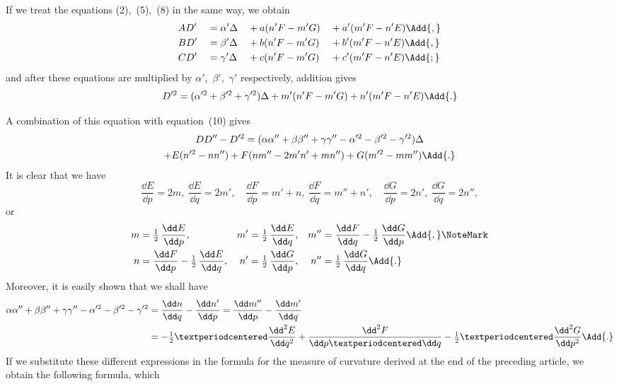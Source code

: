 If we treat the equations (2),~(5),~(8) in the same way, we obtain
\begin{alignat*}{4}
&AD' &&= \alpha'\Delta &&+ a (n'F - m'G) &&+ a'(m'F - n'E)\Add{,} \\
&BD' &&= \beta' \Delta &&+ b (n'F - m'G) &&+ b'(m'F - n'E)\Add{,} \\
&CD' &&= \gamma'\Delta &&+ c (n'F - m'G) &&+ c'(m'F - n'E)\Add{;}
\end{alignat*}
and after these equations are multiplied by $\alpha'$,~$\beta'$,~$\gamma'$ respectively, addition gives
\[
D'^{2} = (\alpha'^{2} + \beta'^{2} + \gamma'^{2})\Delta
  + m'(n'F - m'G) + n'(m'F - n'E)\Add{.}
\]

A combination of this equation with equation~(10) gives
\begin{multline*}
DD'' - D'^{2} = (\alpha\alpha'' + \beta\beta'' + \gamma\gamma''
  - \alpha'^{2} - \beta'^{2} - \gamma'^{2})\Delta \\
  + E(n'^{2} - nn'') + F(nm'' - 2m'n' + mn'') + G(m'^{2} - mm'')\Add{.}
\end{multline*}
It is clear that we have
\[
\frac{\dd E}{\dd p} = 2m,\
\frac{\dd E}{\dd q} = 2m',\quad
\frac{\dd F}{\dd p} = m' + n,\
\frac{\dd F}{\dd q} = m'' + n',\quad
\frac{\dd G}{\dd p} = 2n',\
\frac{\dd G}{\dd q} = 2n'',
\]
or
\begin{align*}
m   &= \tfrac{1}{2}\, \frac{\dd E}{\dd p}, &
m'  &= \tfrac{1}{2}\, \frac{\dd E}{\dd q}, &
m'' &= \frac{\dd F}{\dd q} - \tfrac{1}{2}\, \frac{\dd G}{\dd p}\Add{,}\NoteMark \\
%
n   &= \frac{\dd F}{\dd p} - \tfrac{1}{2}\, \frac{\dd E}{\dd q}, &
n'  &= \tfrac{1}{2}\, \frac{\dd G}{\dd p}, &
n'' &= \tfrac{1}{2}\, \frac{\dd G}{\dd q}\Add{.}
\end{align*}
Moreover, it is easily shown that we shall have
\begin{align*}
\alpha\alpha'' + \beta\beta'' + \gamma\gamma''
  - \alpha'^{2} - \beta'^{2} - \gamma'^{2}
  &= \frac{\dd n}{\dd q} - \frac{\dd n'}{\dd p}
   = \frac{\dd m''}{\dd p} - \frac{\dd m'}{\dd q} \\
  &= -\tfrac{1}{2}·\frac{\dd^{2}E}{\dd q^{2}}
  + \frac{\dd^{2}F}{\dd p·\dd q}
  - \tfrac{1}{2}·\frac{\dd^{2}G}{\dd p^{2}}\Add{.}
\end{align*}
\PageSep{20}
If we substitute these different expressions in the formula for the measure of curvature
derived at the end of the preceding article, we obtain the following formula, which
